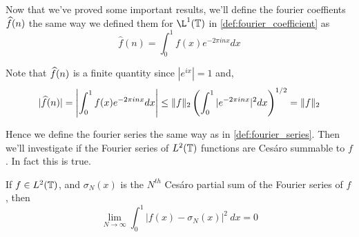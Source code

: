  Now that we've proved some important results, we'll define the fourier coeffients $\widehat{f}(n)$ the same way we defined them for $\L^1(\T)$ in \autoref{def:fourier_coefficient} as 
$$\hat{f}(n) = \int_0^1 f(x)e^{-2\pi inx} dx$$

Note that $\widehat{f}(n)$ is a finite quantity since $|e^{ix}| = 1$ and,
$$ |\widehat{f}(n)| = \left| \int_0^1 f(x)e^{-2\pi inx} dx \right| \le \|f\|_2\left(\int_0^1 |e^{-2\pi inx}|^2 dx\right)^{1/2} = \|f\|_2 $$

Hence we define the fourier series the same way as in \autoref{def:fourier_series}. Then we'll investigate if the Fourier series of $L^2(\mathbb T)$ functions are Ces\'aro summable to $f$. In fact this is true.

\begin{theorem}
  If $f\in L^2(\mathbb T)$, and $\sigma_N(x)$ is the $N^{th}$ Ces\'aro partial sum of the Fourier series of $f$, then
  $$ \lim_{N \to \infty} \int_0^1 |f(x) - \sigma_N(x)|^2 \ dx = 0$$
\end{theorem}


